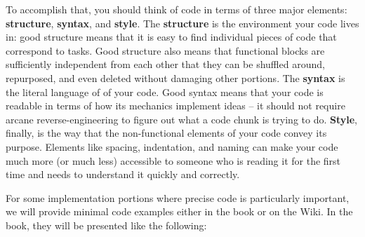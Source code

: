 To accomplish that, you should think of code in terms of three major elements:
\textbf{structure}, \textbf{syntax}, and \textbf{style}.
The \textbf{structure} is the environment your code lives in:
good structure means that it is easy to find individual pieces of code that correspond to tasks.
Good structure also means that functional blocks are sufficiently independent from each other
that they can be shuffled around, repurposed, and even deleted without damaging other portions.
The \textbf{syntax} is the literal language of of your code.
Good syntax means that your code is readable
in terms of how its mechanics implement ideas --
it should not require arcane reverse-engineering
to figure out what a code chunk is trying to do.
\textbf{Style}, finally, is the way that the non-functional elements of your code convey its purpose.
Elements like spacing, indentation, and naming can make your code much more (or much less)
accessible to someone who is reading it for the first time and needs to understand it quickly and correctly.


For some implementation portions where precise code is particularly important,
we will provide minimal code examples either in the book or on the Wiki.
In the book, they will be presented like the following:

\begin{minipage}{1.5\textwidth}
	\vspace{.5cm}
	\vspace{.3cm}
\end{minipage}

